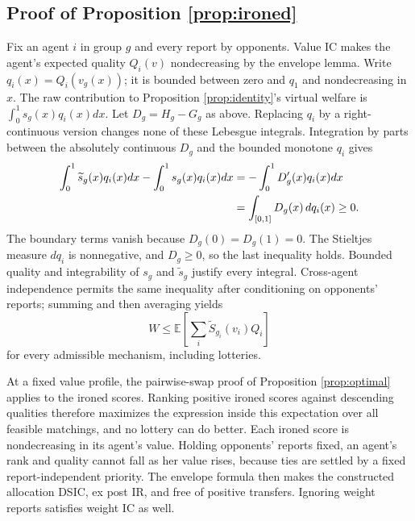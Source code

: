 \documentclass[11pt]{article}
\newcommand{\E}{\mathbb E}
\begin{document}
\subsection{Proof of Proposition \ref{prop:ironed}}\label{app:ironedproof}

Fix an agent $i$ in group $g$ and every report by opponents. Value IC makes the agent's expected quality $Q_i(v)$ nondecreasing by the envelope lemma. Write $q_i(x)=Q_i(v_g(x))$; it is bounded between zero and $q_1$ and nondecreasing in $x$. The raw contribution to Proposition \ref{prop:identity}'s virtual welfare is $\int_0^1s_g(x)q_i(x)dx$. Let $D_g=H_g-G_g$ as above. Replacing $q_i$ by a right-continuous version changes none of these Lebesgue integrals. Integration by parts between the absolutely continuous $D_g$ and the bounded monotone $q_i$ gives
\begin{align}\label{eq:ironinginequality}
\int_0^1\widetilde s_g(x)q_i(x)dx
-\int_0^1s_g(x)q_i(x)dx
&=-\int_0^1D_g'(x)q_i(x)dx\notag\\
&=\int_{[0,1]}D_g(x)\,dq_i(x)\ge0.
\end{align}
The boundary terms vanish because $D_g(0)=D_g(1)=0$. The Stieltjes measure $dq_i$ is nonnegative, and $D_g\ge0$, so the last inequality holds. Bounded quality and integrability of $s_g$ and $\widetilde s_g$ justify every integral. Cross-agent independence permits the same inequality after conditioning on opponents' reports; summing and then averaging yields
\[
W\le\E\!\left[\sum_i\widetilde S_{g_i}(v_i)Q_i\right]
\]
for every admissible mechanism, including lotteries.

At a fixed value profile, the pairwise-swap proof of Proposition \ref{prop:optimal} applies to the ironed scores. Ranking positive ironed scores against descending qualities therefore maximizes the expression inside this expectation over all feasible matchings, and no lottery can do better. Each ironed score is nondecreasing in its agent's value. Holding opponents' reports fixed, an agent's rank and quality cannot fall as her value rises, because ties are settled by a fixed report-independent priority. The envelope formula then makes the constructed allocation DSIC, ex post IR, and free of positive transfers. Ignoring weight reports satisfies weight IC as well.
\end{document}
